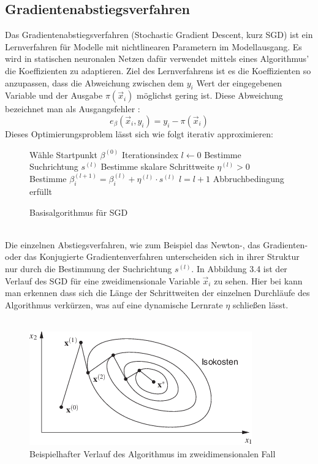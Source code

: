 \subsection{Gradientenabstiegsverfahren}
Das Gradientenabstiegsverfahren (Stochastic Gradient Descent, kurz SGD) ist ein Lernverfahren für Modelle mit nichtlinearen Parametern im Modellausgang. Es wird in statischen neuronalen Netzen dafür verwendet mittels eines Algorithmus' die Koeffizienten zu adaptieren. Ziel des Lernverfahrens ist es die Koeffizienten so anzupassen, dass die Abweichung  zwischen dem $y_i$ Wert der eingegebenen Variable und der Ausgabe $\pi(\vec x_i)$ möglichst gering ist. Diese Abweichung bezeichnet man als Ausgangsfehler \cite{IV}:
\begin{displaymath}
e_{\beta}(\vec x_i , y_i)=y_i-\pi(\vec x_i)
\end{displaymath}
Dieses Optimierungsproblem lässt sich wie folgt iterativ approximieren:
\begin{figure}[ht]
\centering
\begin{algorithmic}[1]
\STATE Wähle Startpunkt $\beta^{(0)}$
\STATE Iterationsindex $l \leftarrow 0$
\REPEAT
\STATE Bestimme Suchrichtung $s^{(l)}$
\STATE Bestimme skalare Schrittweite $\eta^{(l)} > 0$
\STATE Bestimme $\beta_i^{(l+1)} = \beta_i^{(l)} + \eta^{(l)} \cdot s^{(l)}$
\ENDFOR
\STATE $l=l+1$
\UNTIL Abbruchbedingung erfüllt
\end{algorithmic}
\caption{Basisalgorithmus für SGD}
\end{figure}\\
Die einzelnen Abstiegsverfahren, wie zum Beispiel das Newton-, das Gradienten- oder das Konjugierte Gradientenverfahren unterscheiden sich in ihrer Struktur nur durch die Bestimmung der Suchrichtung $s^{(l)}$\cite{PAPA}. In Abbildung 3.4 ist der Verlauf des SGD für eine zweidimensionale Variable $\vec x_i$ zu sehen. Hier bei kann man erkennen dass sich die Länge der Schrittweiten der einzelnen Durchläufe des Algorithmus verkürzen, was auf eine dynamische Lernrate $\eta$ schließen lässt.\\\\
\begin{figure}[ht]
\centering
\includegraphics[scale=1.7]{bilder/SGD}
\caption{Beispielhafter Verlauf des Algorithmus im zweidimensionalen Fall}
\end{figure}\newpage
